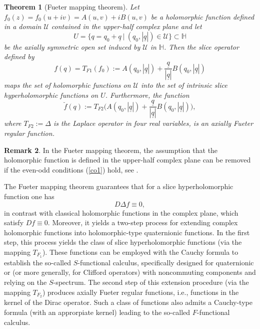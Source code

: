 \documentclass[reqno,11pt]{amsart}
\newtheorem{theorem}{Theorem}[section]
\theoremstyle{definition}
\newtheorem{remark}[theorem]{Remark}
\begin{document}
\begin{theorem}[Fueter mapping theorem]
\label{Fueter1}
	Let $f_0(z)=f_0(u+iv)= A(u,v)+i B(u,v)$ be a holomorphic function defined in a domain $\mathcal{U}$ contained in the upper-half complex plane and let
\[
U=\big\{q=q_0+ \underline{q} \ | \ (q_0, |\underline{q}|) \in \mathcal{U}\big\}\subset \mathbb{H}
\]
	be the axially symmetric open set induced by $\mathcal{U}$ in $ \mathbb{H}$. Then the slice operator defined by
\begin{equation*}
f(q)= T_{F1}(f_0):= A(q_0, |\underline{q}|)+ \frac{\underline{q}}{|\underline{q}|} B(q_0, |\underline{q}|)
\end{equation*}
	maps the set of holomorphic functions on $\mathcal{U}$ into the set of intrinsic slice hyperholomorphic functions on $U$.
	Furthermore, the function
	\[
	\breve{f}(q):= T_{F2} \Big(A(q_0, |\underline{q}|)+ \frac{\underline{q}}{|\underline{q}|} B(q_0, |\underline{q}|)\Big),
	\]
	where $ T_{F2}:= \Delta$ is the Laplace operator in four real variables, is an axially Fueter regular function.
\end{theorem}
\begin{remark}
 In the Fueter mapping theorem, the assumption that the holomorphic function is defined in the upper-half complex plane can be removed if the even-odd conditions (\ref{co1}) hold, see \cite{Q, Q2, TaoQian1}.
\end{remark}

The Fueter mapping theorem guarantees that for a slice hyperholomorphic function one has
\[
D\Delta f\equiv 0,
\]
in contrast with classical holomorphic functions in the complex plane, which satisfy $Df\equiv 0$. Moreover, it yields a two-step process for extending complex holomorphic functions into holomorphic-type quaternionic functions. In the first step, this process yields the class of slice hyperholomorphic functions (via the mapping $T_{F_1}$). These functions can be employed with the Cauchy formula to establish the so-called \( S \)-functional calculus, specifically designed for quaternionic or (or more generally, for Clifford operators) with noncommuting components and relying on the \( S \)-spectrum. The second step of this extension procedure (via the mapping $T_{F_2}$) produces axially Fueter regular functions, i.e., functions in the kernel of the Dirac operator. Such a class of functions also admits a Cauchy-type formula (with an approrpiate kernel) leading to the so-called $F$-functional calculus.
\end{document}
